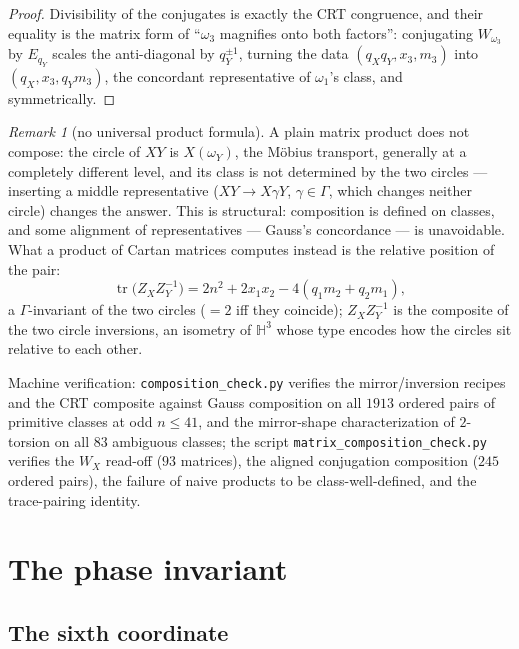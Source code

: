 \documentclass[11pt]{amsart}
\numberwithin{equation}{section}
\theoremstyle{plain}
\theoremstyle{definition}
\theoremstyle{remark}
\newtheorem{remark}[theorem]{Remark}
\newcommand{\HH}{\mathbb{H}}
\newcommand{\tr}{\operatorname{tr}}
\begin{document}
\begin{proof}
Divisibility of the conjugates is exactly the CRT congruence, and their
equality is the matrix form of ``$\omega_3$ magnifies onto both
factors'': conjugating $W_{\omega_3}$ by $E_{q_Y}$ scales the
anti-diagonal by $q_Y^{\pm1}$, turning the data $(q_Xq_Y, x_3, m_3)$
into $(q_X, x_3, q_Ym_3)$, the concordant representative of
$\omega_1$'s class, and symmetrically.
\end{proof}

\begin{remark}[no universal product formula]\label{rem:noproduct}
A plain matrix product does not compose: the circle of $XY$ is
$X(\omega_Y)$, the M\"obius transport, generally at a completely
different level, and its class is not determined by the two circles ---
inserting a middle representative ($XY \to X\gamma Y$, $\gamma \in
\Gamma$, which changes neither circle) changes the answer.  This is
structural: composition is defined on classes, and some alignment of
representatives --- Gauss's concordance --- is unavoidable.  What a
product of Cartan matrices computes instead is the relative position of
the pair:
\[
  \tr\bigl(Z_XZ_Y^{-1}\bigr) = 2n^2 + 2x_1x_2 - 4(q_1m_2 + q_2m_1),
\]
a $\Gamma$-invariant of the two circles ($= 2$ iff they coincide);
$Z_XZ_Y^{-1}$ is the composite of the two circle inversions, an
isometry of $\HH^3$ whose type encodes how the circles sit relative to
each other.
\end{remark}

Machine verification: \texttt{composition\_check.py} verifies the
mirror/inversion recipes and the CRT composite against Gauss
composition on all $1913$ ordered pairs of primitive classes at odd
$n \le 41$, and the mirror-shape characterization of $2$-torsion on all
$83$ ambiguous classes; the script
\texttt{matrix\_\allowbreak composition\_\allowbreak check.py} verifies
the $W_X$ read-off ($93$ matrices), the aligned conjugation composition
($245$ ordered pairs), the failure of naive products to be
class-well-defined, and the trace-pairing identity.

\section{The phase invariant}\label{sec:phase}

\subsection{The sixth coordinate}\label{subsec:sixth}
\end{document}
